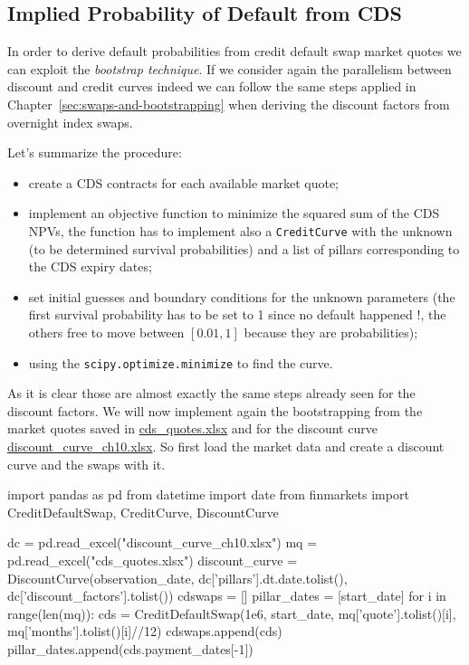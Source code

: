 \subsection{Implied Probability of Default from CDS}\label{default-probabilities-and-cds}

In order to derive default probabilities from credit default swap market quotes we can exploit the \emph{bootstrap technique}. If we consider again the parallelism between discount and credit curves indeed we can follow the same steps applied in Chapter~\ref{sec:swaps-and-bootstrapping} when deriving the discount factors from overnight index swaps.

Let's summarize the procedure: 
\begin{itemize}
\tightlist
\item create a CDS contracts for each available market quote;
\item implement an objective function to minimize the squared sum of the CDS NPVs, the function has to implement also a \texttt{CreditCurve} with the unknown (to be determined survival probabilities) and a list of pillars corresponding to the CDS expiry dates;
\item set initial guesses and boundary conditions for the unknown parameters (the first survival probability has to be set to 1 since no default happened !, the others free to move between $[0.01, 1]$ because they are probabilities);
\item using the \texttt{scipy.optimize.minimize} to find the curve.
\end{itemize}

As it is clear those are almost exactly the same steps already seen for the discount factors. We will now implement again the bootstrapping from the market quotes saved in \href{https://github.com/matteosan1/finance_course/raw/develop/libro/input_files/cds_quotes.xlsx}{cds\_quotes.xlsx} and for the discount curve \href{https://github.com/matteosan1/finance_course/raw/develop/libro/input_files/discount_curve_ch_10.xlsx}{discount\_curve\_ch10.xlsx}.
So first load the market data and create a discount curve and the swaps with it.

\begin{ipython}
import pandas as pd
from datetime import date
from finmarkets import CreditDefaultSwap, CreditCurve, DiscountCurve

dc = pd.read_excel("discount_curve_ch10.xlsx")
mq = pd.read_excel("cds_quotes.xlsx")
discount_curve = DiscountCurve(observation_date,
                               dc['pillars'].dt.date.tolist(),
                               dc['discount_factors'].tolist())
cdswaps = []
pillar_dates = [start_date]
for i in range(len(mq)):
    cds = CreditDefaultSwap(1e6, start_date,
                            mq['quote'].tolist()[i],
                            mq['months'].tolist()[i]//12)
    cdswaps.append(cds)
    pillar_dates.append(cds.payment_dates[-1])
\end{ipython}

